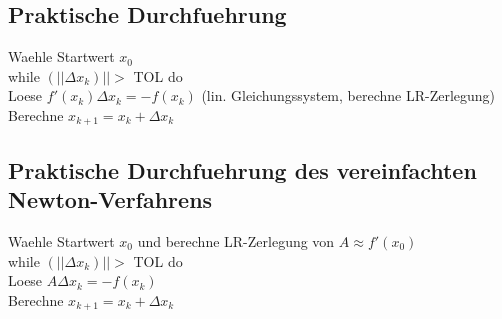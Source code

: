 \documentclass[a4paper]{scrreprt}
\begin{document}
\subsection{Praktische Durchfuehrung}
Waehle Startwert $x_0$\\
while $(|| \Delta x_k)|| >$ TOL do\\
\hspace*{10mm} Loese $f'(x_k) \Delta x_k = -f(x_k)$ (lin. Gleichungssystem, berechne LR-Zerlegung)\\
\hspace*{10mm} Berechne $x_{k+1} = x_k + \Delta x_k$\\

\subsection{Praktische Durchfuehrung des vereinfachten Newton-Verfahrens}
Waehle Startwert $x_0$ und berechne LR-Zerlegung von $A \approx f'(x_0)$\\
while $(|| \Delta x_k)|| >$ TOL do\\
\hspace*{10mm} Loese $A \Delta x_k = -f(x_k)$\\
\hspace*{10mm} Berechne $x_{k+1} = x_k + \Delta x_k$\\
\end{document}

